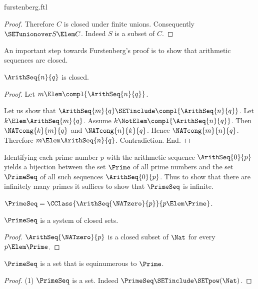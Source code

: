 \documentclass{stex}
\begin{document}
\begin{smodule}{furstenberg.ftl}
\begin{forthel}
\begin{proof}
    Therefore $C$ is closed under finite unions.
    Consequently $\SETunionover S \Elem C$.
    Indeed $S$ is a subset of $C$.
  \end{proof}
\end{forthel}

An important step towards Furstenberg's proof is to show that arithmetic
sequences are closed.

\begin{forthel}
  \begin{lemma}
    $\ArithSeq{n}{q}$ is closed.
  \end{lemma}
  \begin{proof}
    Let $m \Elem \compl{\ArithSeq{n}{q}}$.

    Let us show that $\ArithSeq{m}{q} \SETinclude \compl{\ArithSeq{n}{q}}$.
      Let $k \Elem \ArithSeq{m}{q}$.
      Assume $k \NotElem \compl{\ArithSeq{n}{q}}$.
      Then $\NATcong{k}{m}{q}$ and $\NATcong{n}{k}{q}$.
      Hence $\NATcong{m}{n}{q}$.
      Therefore $m \Elem \ArithSeq{n}{q}$.
      Contradiction.
    End.
  \end{proof}
\end{forthel}

Identifying each prime number $p$ with the arithmetic sequence $\ArithSeq{0}{p}$
yields a bijection between the set $\Prime$ of all prime numbers and the set
$\PrimeSeq$ of all such sequences $\ArithSeq{0}{p}$.
Thus to show that there are infinitely many primes it suffices to show that
$\PrimeSeq$ is infinite.

\begin{forthel}
  \begin{definition}[for=PrimeSeq]
    $\PrimeSeq = \CClass{\ArithSeq{\NATzero}{p}}{p \Elem \Prime}$.
  \end{definition}

  \begin{lemma}
    $\PrimeSeq$ is a system of closed sets.
  \end{lemma}
  \begin{proof}
    $\ArithSeq{\NATzero}{p}$ is a closed subset of $\Nat$ for every $p \Elem \Prime$.
  \end{proof}

  \begin{lemma}
    $\PrimeSeq$ is a set that is equinumerous to $\Prime$.
  \end{lemma}
  \begin{proof}
    (1) $\PrimeSeq$ is a set.
    Indeed $\PrimeSeq \SETinclude \SETpow(\Nat)$.


\end{proof}
\end{forthel}
\end{smodule}
\end{document}
